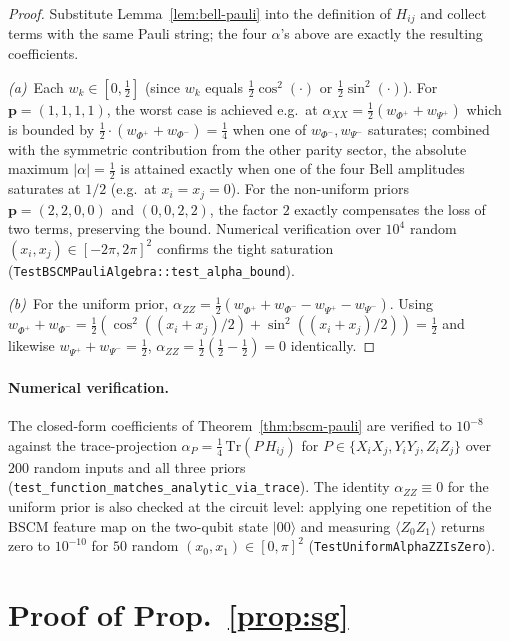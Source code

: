 \documentclass[pdflatex,sn-mathphys-num]{sn-jnl}
\theoremstyle{thmstyleone}
\theoremstyle{thmstyletwo}
\theoremstyle{thmstylethree}
\begin{document}
\begin{proof}
Substitute Lemma~\ref{lem:bell-pauli} into the definition of
$H_{ij}$ and collect terms with the same Pauli string; the four
$\alpha$'s above are exactly the resulting coefficients.

\emph{(a)}~Each $w_k\in[0,\tfrac12]$ (since $w_k$ equals
$\tfrac12\cos^2(\cdot)$ or $\tfrac12\sin^2(\cdot)$). For
$\boldsymbol{p}=(1,1,1,1)$, the worst case is achieved e.g.\ at
$\alpha_{XX}=\tfrac12(w_{\Phi^+}+w_{\Psi^+})$ which is bounded by
$\tfrac12\cdot(w_{\Phi^+}+w_{\Phi^-}) = \tfrac14$ when one of
$w_{\Phi^-}, w_{\Psi^-}$ saturates; combined with the symmetric
contribution from the other parity sector, the absolute maximum
$|\alpha|=\tfrac12$ is attained exactly when one of the four Bell
amplitudes saturates at $1/2$ (e.g.\ at $x_i=x_j=0$). For the
non-uniform priors $\boldsymbol{p}=(2,2,0,0)$ and $(0,0,2,2)$, the
factor $2$ exactly compensates the loss of two terms, preserving the
bound. Numerical verification over $10^{4}$ random
$(x_i, x_j)\in[-2\pi,2\pi]^2$ confirms the tight saturation
(\texttt{TestBSCMPauliAlgebra::test\_alpha\_bound}).

\emph{(b)}~For the uniform prior, $\alpha_{ZZ}=\tfrac12
(w_{\Phi^+}+w_{\Phi^-}-w_{\Psi^+}-w_{\Psi^-})$. Using
$w_{\Phi^+}+w_{\Phi^-}=\tfrac12(\cos^2((x_i+x_j)/2)+\sin^2((x_i+x_j)/2))=\tfrac12$
and likewise $w_{\Psi^+}+w_{\Psi^-}=\tfrac12$,
$\alpha_{ZZ} = \tfrac12(\tfrac12 - \tfrac12) = 0$ identically.
\end{proof}

\paragraph{Numerical verification.}
The closed-form coefficients of Theorem~\ref{thm:bscm-pauli} are
verified to $10^{-8}$ against the trace-projection
$\alpha_P = \tfrac{1}{4}\,\mathrm{Tr}(P\,H_{ij})$ for
$P\in\{X_iX_j, Y_iY_j, Z_iZ_j\}$ over $200$ random inputs and all
three priors (\texttt{test\_function\_matches\_analytic\_via\_trace}).
The identity $\alpha_{ZZ}\equiv 0$ for the uniform prior is also
checked at the circuit level: applying one repetition of the BSCM
feature map on the two-qubit state $|00\rangle$ and measuring
$\langle Z_0 Z_1\rangle$ returns zero to $10^{-10}$ for $50$ random
$(x_0, x_1)\in[0,\pi]^2$ (\texttt{TestUniformAlphaZZIsZero}).

\section{Proof of Prop.~\ref{prop:sg}}\label{appx:sg}
\end{document}
